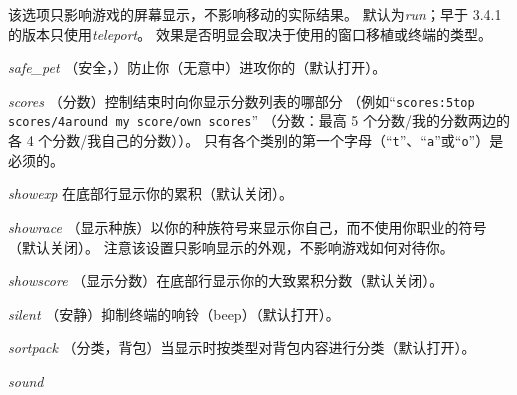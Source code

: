 \documentclass[a4paper, 10pt]{article}
\newcommand{\ib}[1]{\it #1 \hfill}
\begin{document}
该选项只影响游戏的屏幕显示，不影响移动的实际结果。
默认为{\it run\/}；早于 3.4.1 的版本只使用{\it teleport\/}。
效果是否明显会取决于使用的窗口移植或终端的类型。
\item[\ib{safe\_pet}]
（安全，\zhTransPets）防止你（无意中）进攻你的\zhTransPets（默认打开）。
\item[\ib{scores}]
（分数）控制结束时向你显示分数列表的哪部分
（例如“{\tt scores:5top scores/4around my score/own scores}”
（分数：最高 5 个分数/我的分数两边的各 4 个分数/我自己的分数））。
只有各个类别的第一个字母（“{\tt t}”、“{\tt a}”或“{\tt o}”）是必须的。
\item[\ib{showexp}]
在底部行显示你的累积\zhTransExperiencePoints（默认关闭）。
\item[\ib{showrace}]
（显示种族）以你的种族符号来显示你自己，而不使用你职业的符号（默认关闭）。
注意该设置只影响显示的外观，不影响游戏如何对待你。
\item[\ib{showscore}]
（显示分数）在底部行显示你的大致累积分数（默认关闭）。
\item[\ib{silent}]
（安静）抑制终端的响铃（beep）（默认打开）。
\item[\ib{sortpack}]
（分类，背包）当显示\zhTransInventory{}时按类型对背包内容进行分类（默认打开）。
\item[\ib{sound}]
\end{document}
